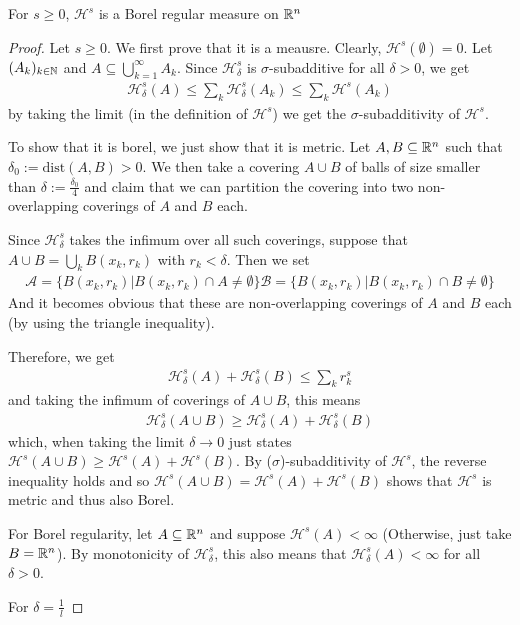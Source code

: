 \begin{thm}[]
For $s \geq 0$, $\mathcal{H}^{s}$ is a Borel regular measure on $\mathbb{R}^{n}$
\end{thm}
\begin{proof}
  Let $s \geq 0$. 
  We first prove that it is a meausre.
  Clearly, $\mathcal{H}^{s}(\emptyset) = 0$.
  Let $(A_k)_{k \in \mathbb{N}}$ and $A \subseteq \bigcup_{k=1}^{\infty}A_k$.
  Since $\mathcal{H}_{\delta}^{s}$ is $\sigma$-subadditive for all $\delta > 0$, we get
  \begin{align*}
    \mathcal{H}_{\delta}^{s}(A)\leq \sum_{k}\mathcal{H}_{\delta}^{s}(A_k) \leq \sum_{k}\mathcal{H}^{s}(A_k)
  \end{align*}
  by taking the limit (in the definition of $\mathcal{H}^{s}$) we get the $\sigma$-subadditivity of $\mathcal{H}^{s}$.

  To show that it is borel, we just show that it is metric.
  Let $A,B \subseteq \mathbb{R}^{n}$ such that $\delta_0 := \text{dist}(A,B) > 0$.
  We then take a covering $A \cup B$ of balls of size smaller than $\delta := \tfrac{\delta_0}{4}$ and claim that we can partition the covering into two non-overlapping coverings of $A$ and $B$ each.


  Since $\mathcal{H}_{\delta}^{s}$ takes the infimum over all such coverings, suppose that $A \cup B = \bigcup_{k}B(x_k,r_k)$ with $r_k < \delta$.
  Then we set
  \begin{align*}
    \mathcal{A} = \{B(x_k,r_k) \big\vert B(x_k,r_k) \cap A \neq \emptyset\}
    \mathcal{B} = \{B(x_k,r_k) \big\vert B(x_k,r_k) \cap B \neq \emptyset\}
  \end{align*}
  And it becomes obvious that 
  these are non-overlapping coverings of $A$ and $B$ each (by using the triangle inequality).

  Therefore, we get
  \begin{align*}
    \mathcal{H}_{\delta}^{s}(A) + \mathcal{H}_{\delta}^{s}(B) \leq \sum_{k}r_k^{s}
  \end{align*}
  and taking the infimum of coverings of $A \cup B$, this means
  \begin{align*}
    \mathcal{H}_{\delta}^{s}(A \cup B) \geq \mathcal{H}_{\delta}^{s}(A) + \mathcal{H}_{\delta}^{s}(B) 
  \end{align*}
  which, when taking the limit $\delta \to 0$ just states $\mathcal{H}^{s}(A \cup B) \geq \mathcal{H}^{s}(A) + \mathcal{H}^{s}(B)$.
  By ($\sigma$)-subadditivity of $\mathcal{H}^{s}$, the reverse inequality holds and so $\mathcal{H}^{s}(A \cup B) = \mathcal{H}^{s}(A) + \mathcal{H}^{s}(B)$ shows that $\mathcal{H}^{s}$ is metric and thus also Borel.

  For Borel regularity, let $A \subseteq \mathbb{R}^{n}$ and suppose $\mathcal{H}^{s}(A) < \infty$ (Otherwise, just take $B = \mathbb{R}^{n}$).
  By monotonicity of $\mathcal{H}_{\delta}^{s}$, this also means that $\mathcal{H}_{\delta}^{s}(A) < \infty$ for all $\delta > 0$.

  For $\delta = \tfrac{1}{l}$ 



\end{proof}

